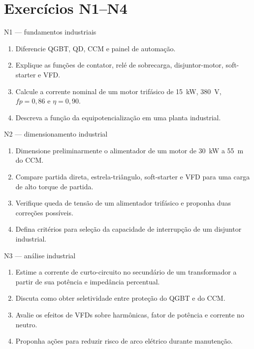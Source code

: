\section{Exercícios N1--N4}
\begin{frame}{N1 — fundamentos industriais}
\small
\begin{enumerate}
\item Diferencie QGBT, QD, CCM e painel de automação.
\item Explique as funções de contator, relé de sobrecarga, disjuntor-motor, soft-starter e VFD.
\item Calcule a corrente nominal de um motor trifásico de \SI{15}{kW}, \SI{380}{V}, $fp=0{,}86$ e $\eta=0{,}90$.
\item Descreva a função da equipotencialização em uma planta industrial.
\end{enumerate}
\end{frame}

\begin{frame}{N2 — dimensionamento industrial}
\small
\begin{enumerate}
\item Dimensione preliminarmente o alimentador de um motor de \SI{30}{kW} a \SI{55}{m} do CCM.
\item Compare partida direta, estrela-triângulo, soft-starter e VFD para uma carga de alto torque de partida.
\item Verifique queda de tensão de um alimentador trifásico e proponha duas correções possíveis.
\item Defina critérios para seleção da capacidade de interrupção de um disjuntor industrial.
\end{enumerate}
\end{frame}

\begin{frame}{N3 — análise industrial}
\small
\begin{enumerate}
\item Estime a corrente de curto-circuito no secundário de um transformador a partir de sua potência e impedância percentual.
\item Discuta como obter seletividade entre proteção do QGBT e do CCM.
\item Avalie os efeitos de VFDs sobre harmônicas, fator de potência e corrente no neutro.
\item Proponha ações para reduzir risco de arco elétrico durante manutenção.
\end{enumerate}
\end{frame}

